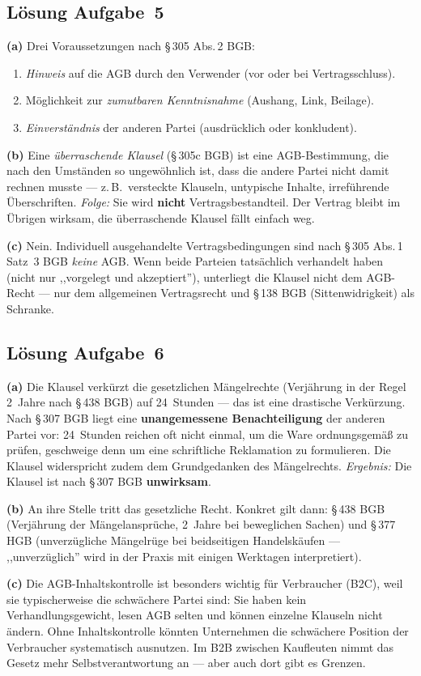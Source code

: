 \documentclass[11pt, a4paper]{article}
\begin{document}
\subsection*{Lösung Aufgabe~5}
\begin{loesung}
\textbf{(a)} Drei Voraussetzungen nach §\,305 Abs.\,2 BGB:
\begin{enumerate}[itemsep=0pt]
  \item \emph{Hinweis} auf die AGB durch den Verwender (vor oder bei Vertragsschluss).
  \item Möglichkeit zur \emph{zumutbaren Kenntnisnahme} (Aushang, Link, Beilage).
  \item \emph{Einverständnis} der anderen Partei (ausdrücklich oder konkludent).
\end{enumerate}

\textbf{(b)} Eine \emph{überraschende Klausel} (§\,305c BGB) ist eine AGB-Bestimmung,
die nach den Umständen so ungewöhnlich ist, dass die andere Partei nicht damit rechnen
musste --- z.\,B.\ versteckte Klauseln, untypische Inhalte, irreführende Überschriften.
\emph{Folge:} Sie wird \textbf{nicht} Vertragsbestandteil. Der Vertrag bleibt im Übrigen
wirksam, die überraschende Klausel fällt einfach weg.

\textbf{(c)} Nein. Individuell ausgehandelte Vertragsbedingungen sind nach §\,305 Abs.\,1
Satz~3 BGB \emph{keine} AGB. Wenn beide Parteien tatsächlich verhandelt haben (nicht nur
,,vorgelegt und akzeptiert''), unterliegt die Klausel nicht dem AGB-Recht --- nur dem
allgemeinen Vertragsrecht und §\,138 BGB (Sittenwidrigkeit) als Schranke.
\end{loesung}

\subsection*{Lösung Aufgabe~6}
\begin{loesung}
\textbf{(a)} Die Klausel verkürzt die gesetzlichen Mängelrechte (Verjährung in der Regel
2~Jahre nach §\,438 BGB) auf 24~Stunden --- das ist eine drastische Verkürzung. Nach
§\,307 BGB liegt eine \textbf{unangemessene Benachteiligung} der anderen Partei vor:
24~Stunden reichen oft nicht einmal, um die Ware ordnungsgemäß zu prüfen, geschweige
denn um eine schriftliche Reklamation zu formulieren. Die Klausel widerspricht zudem
dem Grundgedanken des Mängelrechts. \emph{Ergebnis:} Die Klausel ist nach §\,307 BGB
\textbf{unwirksam}.

\textbf{(b)} An ihre Stelle tritt das gesetzliche Recht. Konkret gilt dann: §\,438 BGB
(Verjährung der Mängelansprüche, 2~Jahre bei beweglichen Sachen) und §\,377 HGB
(unverzügliche Mängelrüge bei beidseitigen Handelskäufen --- ,,unverzüglich'' wird in
der Praxis mit einigen Werktagen interpretiert).

\textbf{(c)} Die AGB-Inhaltskontrolle ist besonders wichtig für Verbraucher (B2C), weil
sie typischerweise die schwächere Partei sind: Sie haben kein Verhandlungsgewicht, lesen
AGB selten und können einzelne Klauseln nicht ändern. Ohne Inhaltskontrolle könnten
Unternehmen die schwächere Position der Verbraucher systematisch ausnutzen. Im B2B
zwischen Kaufleuten nimmt das Gesetz mehr Selbstverantwortung an --- aber auch dort
gibt es Grenzen.
\end{loesung}
\end{document}
